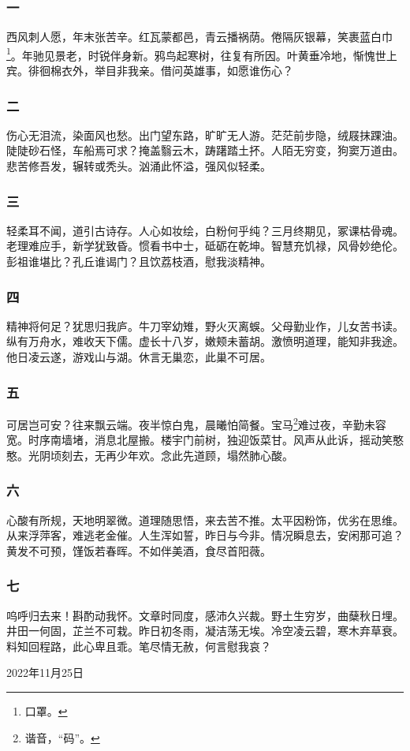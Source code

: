\documentclass[a5paper]{ctexart}
\begin{document}
	\subsubsection{一}
	西风刺人愿，年末张苦辛。红瓦蒙都邑，青云播祸荫。倦隔灰银幕，笑裹蓝白巾\footnote{口罩。}。年驰见景老，时锐伴身新。鸦鸟起寒树，往复有所因。叶黄垂冷地，惭愧世上宾。徘徊棉衣外，举目非我亲。借问英雄事，如愿谁伤心？
	\subsubsection{二}
	伤心无泪流，染面风也愁。出门望东路，旷旷无人游。茫茫前步隐，绒屐抹踝油。陡陡砂石怪，车船焉可求？掩盖翳云木，踌躇踏土抔。人陌无穷变，狗窦万道由。悲苦修吾发，辗转或秃头。汹涌此怀溢，强风似轻柔。
	\subsubsection{三}
	轻柔耳不闻，道引古诗存。人心如妆绘，白粉何乎纯？三月终期见，冢课枯骨魂。老理难应手，新学犹致昏。惯看书中士，砥砺在乾坤。智慧充饥禄，风骨妙绝伦。彭祖谁堪比？孔丘谁谒门？且饮荔枝酒，慰我淡精神。
	\subsubsection{四}
	精神将何足？犹思归我庐。牛刀宰幼雉，野火灭离蜈。父母勤业作，儿女苦书读。纵有万舟水，难收天下儒。虚长十八岁，嫩颊未蓄胡。激愤明道理，能知非我途。他日凌云遂，游戏山与湖。休言无巢恋，此巢不可居。
	\subsubsection{五}
	可居岂可安？往来飘云端。夜半惊白鬼，晨曦怕简餐。宝马\footnote{谐音，“码”。}难过夜，辛勤未容宽。时序南墙堵，消息北屋搬。楼宇门前树，独迎饭菜甘。风声从此诉，摇动笑憨憨。光阴顷刻去，无再少年欢。念此先道顾，塌然肺心酸。
	\subsubsection{六}
	心酸有所规，天地明翠微。道理随思悟，来去苦不推。太平因粉饰，优劣在思维。从来浮萍客，难逃老金催。人生浑如誓，昨日与今非。情况瞬息去，安闲那可追？黄发不可预，馑饭若春晖。不如伴美酒，食尽首阳薇。
	\subsubsection{七}
	呜呼归去来！斟酌动我怀。文章时同度，感沛久兴裁。野土生穷岁，曲蘖秋日埋。井田一何固，芷兰不可栽。昨日初冬雨，凝洁荡无埃。冷空凌云碧，寒木弃草衰。料知回程路，此心卑且乖。笔尽情无赦，何言慰我哀？
	\begin{flushright}
		2022年11月25日
	\end{flushright}
	
\end{document}
